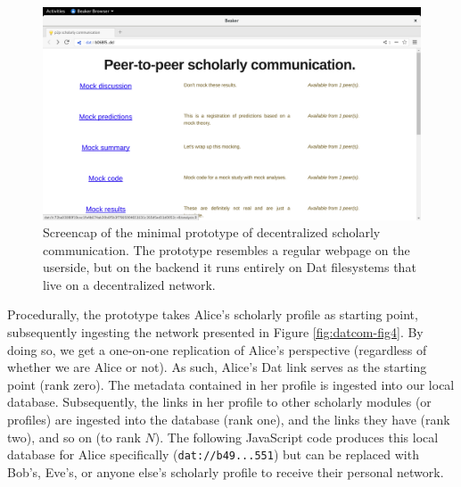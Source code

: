 \documentclass[publications,article,submit,moreauthors,pdftex,10pt,a4paper]{Definitions/mdpi}
\begin{document}
\begin{figure}

{\centering \includegraphics[width=1\linewidth]{fig5} 

}

\caption{Screencap of the minimal prototype of decentralized scholarly communication. The prototype resembles a regular webpage on the userside, but on the backend it runs entirely on Dat filesystems that live on a decentralized network.}\label{fig:datcom-fig5}
\end{figure}

Procedurally, the prototype takes Alice's scholarly profile as starting
point, subsequently ingesting the network presented in Figure
\ref{fig:datcom-fig4}. By doing so, we get a one-on-one replication of
Alice's perspective (regardless of whether we are Alice or not). As
such, Alice's Dat link serves as the starting point (rank zero). The
metadata contained in her profile is ingested into our local database.
Subsequently, the links in her profile to other scholarly modules (or
profiles) are ingested into the database (rank one), and the links they
have (rank two), and so on (to rank \(N\)). The following JavaScript
code produces this local database for Alice specifically
(\texttt{dat://b49...551}) but can be replaced with Bob's, Eve's, or
anyone else's scholarly profile to receive their personal network.
\end{document}
